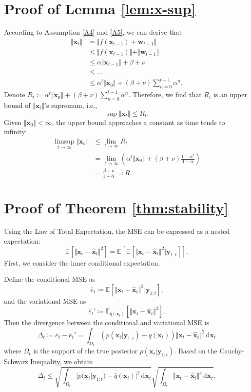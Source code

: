 \documentclass[10pt,twocolumn,twoside]{IEEEtran}
\newcommand{\E}[2][]{ \mathbb{E}_{#1}\left[#2\right] } %
\newcommand{\cm}{\text{,}} %
\newcommand{\fs}{\text{.}} %
\newcommand{\x}{{ \bm{x} }}
\newcommand{\y}{{ \bm{y} }}
\begin{document}
\begin{appendices}
\section{Proof of Lemma \ref{lem:x-sup}} \label{app:lem-x-sup}
According to Assumption \ref{A4} and \ref{A5}, we can derive that
\begin{equation*}
\begin{split}
    \Vert\x_t\Vert &= \Vert f(\x_{t-1})+\bm{w}_{t-1}\Vert \\
    &\leq \Vert f(\x_{t-1})\Vert+\Vert\bm{w}_{t-1}\Vert \\
    &\leq \alpha\Vert\x_{t-1}\Vert+\beta+\nu \\
    &\leq \dots \\
    &\leq \alpha^t\Vert\x_0\Vert+(\beta+\nu)\sum_{n=0}^{t-1}\alpha^n \fs
\end{split}
\end{equation*}
Denote $R_t \coloneqq \alpha^t\Vert\x_0\Vert+(\beta+\nu)\sum_{n=0}^{t-1}\alpha^n$. Therefore, we find that $R_t$ is an upper bound of $\Vert\x_t\Vert$'s supremum, i.e.,
$$
\sup\Vert\x_t\Vert \leq R_t \fs
$$
Given $\Vert\x_0\Vert<\infty$, the upper bound approaches a constant as time tends to infinity:
\begin{equation*}
\begin{split}
    \limsup_{t\rightarrow\infty}\Vert\x_t\Vert &\leq \lim_{t\rightarrow\infty}R_t \\
    &= \lim_{t\rightarrow\infty}\left(\alpha^t\Vert\x_0\Vert+(\beta+\nu)\frac{1-\alpha^t}{1-\alpha}\right) \\
    &= \frac{\beta+\nu}{1-\alpha} \eqqcolon R \fs
\end{split}
\end{equation*}

\section{Proof of Theorem \ref{thm:stability}} \label{app:thm-stability}
Using the Law of Total Expectation, the MSE can be expressed as a nested expectation:
\begin{equation} \label{eq:E[e]}
    \E{\Vert\x_t-\hat\x_t\Vert^2} = \E{\E{\Vert\x_t-\hat\x_t\Vert^2|\y_{1:t}}} \fs
\end{equation}
First, we consider the inner conditional expectation.

Define the conditional MSE as
$$
\bar{e}_t \coloneqq \E{\Vert\x_t-\hat\x_t\Vert^2|\y_{1:t}} \cm
$$
and the variational MSE as
$$
\bar{e}_t' \coloneqq \E[\hat{q}(\x_t)]{\Vert\x_t-\hat\x_t\Vert^2} \fs
$$
Then the divergence between the conditional and variational MSE is
$$
\Delta_t \coloneqq \bar{e}_t-\bar{e}_t' = \int_{\Omega_t}{(p(\x_t|\y_{1:t})-\hat{q}(\x_t))\Vert\x_t-\hat\x_t\Vert^2}\,\mathrm{d}\x_t
$$
where $\Omega_t$ is the support of the true posterior $p(\x_t|\y_{1:t})$. Based on the Cauchy-Schwarz Inequality, we obtain
\begin{equation} \label{eq:cauchy-schwarz}
    \Delta_t \leq \sqrt{\int_{\Omega_t}{|p(\x_t|\y_{1:t})-\hat{q}(\x_t)|^2}\,\mathrm{d}\x_t}\sqrt{\int_{\Omega_t}{\Vert\x_t-\hat\x_t\Vert^4}\,\mathrm{d}\x_t} \fs 
\end{equation}


\end{appendices}
\end{document}
